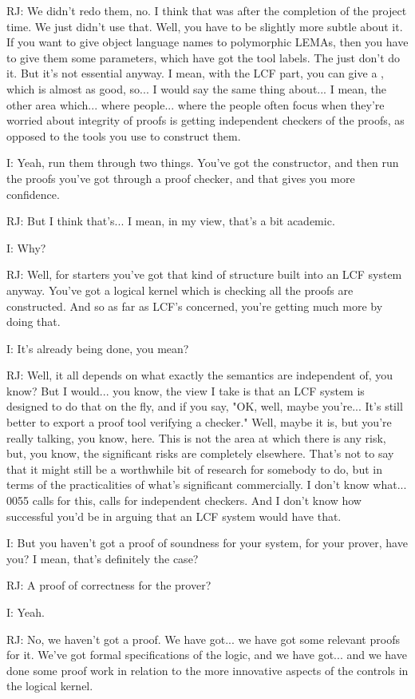 \documentclass[10pt,titlepage]{book}
\begin{document}
RJ: We didn't redo them, no. I think that was after the completion of the project	time. We just didn't use that. Well, you have to be slightly more subtle about it. If you want to give object language names to polymorphic LEMAs, then you have to give them some parameters, which have got the tool labels. The	just don't do it. But it's not essential anyway. I mean, with the LCF part, you can give a	, which is almost as good, so... I would say the same thing about... I mean, the other area which... where people... where the people often focus when they're worried about integrity of proofs is getting independent checkers of the proofs, as opposed to the tools you use to construct them.

I: Yeah, run them through two things. You've got the constructor, and then run the proofs you've got through a proof checker, and that gives you more confidence.

RJ: But I think that's... I mean, in my view, that's a bit academic.

I: Why?

RJ: Well, for starters you've got that kind of structure built into an LCF system anyway. You've got a logical kernel which is checking all the proofs are constructed. And so as far as LCF's concerned, you're getting much more by doing that.

I: It's already being done, you mean?

RJ: Well, it all depends on what exactly the semantics are independent of, you know? But I would... you know, the view I take is that an LCF system is designed to do that on the fly, and if you say, "OK, well, maybe you're... It's still better to export a proof tool verifying a checker." Well, maybe it is, but you're really talking, you know,	here. This is not the area at which there is any risk, but, you know, the significant risks are completely elsewhere. That's not to say that it might still be a worthwhile bit of research for somebody to do, but in terms of the practicalities of what's significant commercially. I don't know what... 0055 calls for this, calls for independent checkers. And I don't know how successful you'd be in arguing that an LCF system would have that.

I: But you haven't got a proof of soundness for your system, for your prover, have you? I mean, that's definitely the case?

RJ: A proof of correctness for the prover?

I: Yeah.

RJ: No, we haven't got a proof. We have got... we have got some relevant proofs for it. We've got formal specifications of the logic, and we have got... and we have done some proof work in relation to the more innovative aspects of the controls in the logical kernel.
\end{document}
